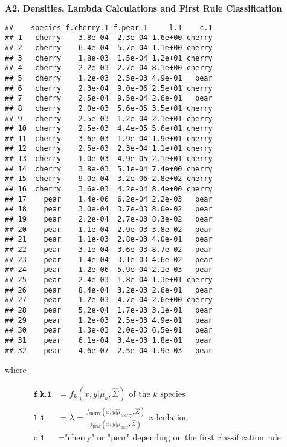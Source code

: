 \documentclass[]{article}
\begin{document}
\newpage

\textbf{A2. Densities, Lambda Calculations and First Rule Classification}

\begin{verbatim}
##    species f.cherry.1 f.pear.1     l.1    c.1
## 1   cherry    3.8e-04  2.3e-04 1.6e+00 cherry
## 2   cherry    6.4e-04  5.7e-04 1.1e+00 cherry
## 3   cherry    1.8e-03  1.5e-04 1.2e+01 cherry
## 4   cherry    2.2e-03  2.7e-04 8.1e+00 cherry
## 5   cherry    1.2e-03  2.5e-03 4.9e-01   pear
## 6   cherry    2.3e-04  9.0e-06 2.5e+01 cherry
## 7   cherry    2.5e-04  9.5e-04 2.6e-01   pear
## 8   cherry    2.0e-03  5.6e-05 3.5e+01 cherry
## 9   cherry    2.5e-03  1.2e-04 2.1e+01 cherry
## 10  cherry    2.5e-03  4.4e-05 5.6e+01 cherry
## 11  cherry    3.6e-03  1.9e-04 1.9e+01 cherry
## 12  cherry    2.5e-03  2.3e-04 1.1e+01 cherry
## 13  cherry    1.0e-03  4.9e-05 2.1e+01 cherry
## 14  cherry    3.8e-03  5.1e-04 7.4e+00 cherry
## 15  cherry    9.0e-04  3.2e-06 2.8e+02 cherry
## 16  cherry    3.6e-03  4.2e-04 8.4e+00 cherry
## 17    pear    1.4e-06  6.2e-04 2.2e-03   pear
## 18    pear    3.0e-04  3.7e-03 8.0e-02   pear
## 19    pear    2.2e-04  2.7e-03 8.3e-02   pear
## 20    pear    1.1e-04  2.9e-03 3.8e-02   pear
## 21    pear    1.1e-03  2.8e-03 4.0e-01   pear
## 22    pear    3.1e-04  3.6e-03 8.7e-02   pear
## 23    pear    1.4e-04  3.1e-03 4.6e-02   pear
## 24    pear    1.2e-06  5.9e-04 2.1e-03   pear
## 25    pear    2.4e-03  1.8e-04 1.3e+01 cherry
## 26    pear    8.4e-04  3.2e-03 2.6e-01   pear
## 27    pear    1.2e-03  4.7e-04 2.6e+00 cherry
## 28    pear    5.2e-04  1.7e-03 3.1e-01   pear
## 29    pear    1.2e-03  2.5e-03 4.9e-01   pear
## 30    pear    1.3e-03  2.0e-03 6.5e-01   pear
## 31    pear    6.1e-04  3.4e-03 1.8e-01   pear
## 32    pear    4.6e-07  2.5e-04 1.9e-03   pear
\end{verbatim}

where

\begin{align*}
\texttt{f.k.1} &= \text{$f_k(x,y|\hat{\mu}_{k}, \hat{\Sigma})$ of the $k$ species} \\ 
\texttt{l.1} &= \text{$\lambda = \frac{f_{\text{cherry}}(x,y|\hat{\mu}_{\text{cherry}}, \hat{\Sigma})}{f_{\text{pear}} (x,y|\hat{\mu}_{\text{pear}}, \hat{\Sigma})}$ calculation} \\
\texttt{c.1} &= \text{"cherry" or "pear" depending on the first classification rule} \\
\end{align*}
\end{document}
